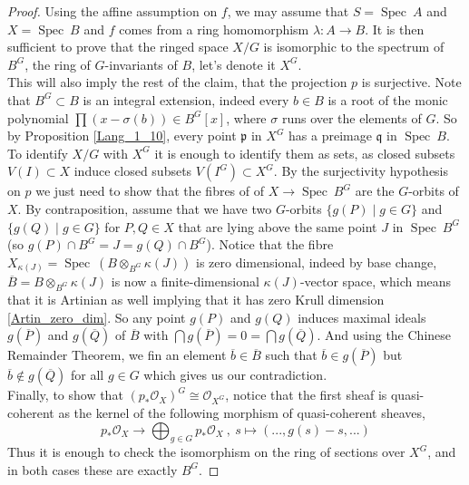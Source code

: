 \documentclass{article}
\theoremstyle{plain}
\theoremstyle{definition}
\DeclareMathOperator{\Spec}{Spec}
\begin{document}
\begin{proof}
    Using the affine assumption on $f$, we may assume that $S=\Spec\:A$ and $X=\Spec\:B$ and $f$ comes from a ring homomorphism $\lambda: A\rightarrow B$.
    It is then sufficient to prove that the ringed space $X/G$ is isomorphic to the spectrum of $B^G$, the ring of $G$-invariants of $B$, let's denote it $X^G$. \\
    This will also imply the rest of the claim, that the projection $p$ is surjective.
    Note that $B^G\subset B$ is an integral extension, indeed every $b\in B$ is a root of the monic polynomial $\prod (x-\sigma(b)) \in B^G[x]$, where $\sigma$ runs over the elements of $G$. So by Proposition \ref{Lang_1_10}, every point $\mathfrak{p}$ in $X^G$ has a preimage $\mathfrak{q}$ in $\Spec\:B$.\\
    To identify $X/G$ with $X^G$ it is enough to identify them as sets, as closed subsets $V(I)\subset X$ induce closed subsets $V(I^G) \subset X^G$. 
    By the surjectivity hypothesis on $p$ we just need to show that the fibres of of $X\rightarrow \Spec\: B^G$ are the $G$-orbits of $X$.
    By contraposition, assume that we have two $G$-orbits $\{g(P)\mid g \in G\}$ and $\{g(Q)\mid g\in G\}$ for $P,Q\in X$ that are lying above the same point $J$ in $\Spec\:B^G$ (so $g(P)\cap B^G = J = g(Q)\cap B^G$).
    Notice that the fibre $X_{\kappa(J)} = \Spec\:(B\otimes_{B^G}\kappa(J))$ is zero dimensional, indeed by base change, $\overline{B}=B\otimes_{B^G}\kappa(J)$ is now a finite-dimensional $\kappa(J)$-vector space, which means that it is Artinian as well implying that it has zero Krull dimension \ref{Artin_zero_dim}.
    So any point $g(P)$ and $g(Q)$ induces maximal ideals $g(\overline{P})$ and $g(\overline{Q})$ of $\overline{B}$ with $\bigcap g(\overline{P}) = 0 = \bigcap g(\overline{Q})$.
    And using the Chinese Remainder Theorem, we fin an element $\overline{b}\in \overline{B}$ such that $\overline{b}\in g(\overline{P})$ but $\overline{b}\notin g(\overline{Q})$ for all $g\in G$ which gives us our contradiction.\\
    Finally, to show that $(p_*\mathcal{O}_X)^G \cong \mathcal{O}_{X^G}$, notice that the first sheaf is quasi-coherent as the kernel of the following morphism of quasi-coherent sheaves,
    $$p_*\mathcal{O}_X \rightarrow \bigoplus_{g\in G} p_*\mathcal{O}_X \: , \: s\mapsto(..., g(s)-s, ...)$$
    Thus it is enough to check the isomorphism on the ring of sections over $X^G$, and in both cases these are exactly $B^G$.    
\end{proof}
\end{document}
